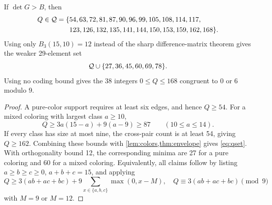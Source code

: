 \begin{corollary}\label{cor:shells}
If $\det G>B$, then
\begin{equation}\label{eq:qset}
\begin{split}
 Q\in\mathcal Q=\{&54,63,72,81,87,90,96,99,105,108,114,117,\\
             &123,126,132,135,141,144,150,153,159,162,168\}.
\end{split}
\end{equation}
Using only $B_3(15,10)=12$ instead of the sharp difference-matrix theorem gives the weaker 29-element set
\[
 \mathcal Q\cup\{27,36,45,60,69,78\}.
\]
Using no coding bound gives the 38 integers $0\le Q\le168$ congruent to 0 or 6 modulo 9.
\end{corollary}
\begin{proof}
A pure-color support requires at least six edges, and hence $Q\ge54$. For a mixed coloring with largest class $a\ge10$,
\[
 Q\ge3a(15-a)+9(a-9)\ge87 \qquad(10\le a\le14).
\]
If every class has size at most nine, the cross-pair count is at least 54, giving $Q\ge162$. Combining these bounds with \cref{lem:colors,thm:envelope} gives \eqref{eq:qset}. With orthogonality bound 12, the corresponding minima are 27 for a pure coloring and 60 for a mixed coloring. Equivalently, all claims follow by listing $a\ge b\ge c\ge0$, $a+b+c=15$, and applying
\[
 Q\ge3(ab+ac+bc)+9\sum_{x\in\{a,b,c\}}\max(0,x-M),
 \quad Q\equiv3(ab+ac+bc)\pmod9
\]
with $M=9$ or $M=12$.
\end{proof}
